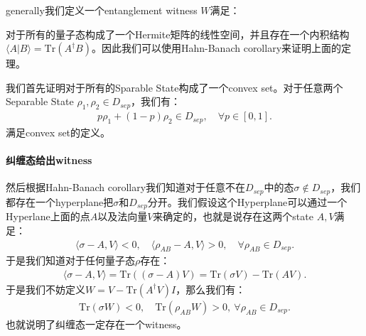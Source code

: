 generally我们定义一个entanglement witness $ W $满足：

\bigskip
{}

对于所有的量子态构成了一个Hermite矩阵的线性空间，并且存在一个内积结构$ \langle A | B \rangle =
\mathrm{Tr}(A^\dagger B) $。因此我们可以使用Hahn-Banach corollary来证明上面的定理。

我们首先证明对于所有的Sparable State构成了一个convex set。对于任意两个Separable State $
\rho_1, \rho_2 \in D_{sep} $，我们有：
\begin{align}
  p \rho_1 + (1-p) \rho_2  \in D_{sep}, \quad \forall p \in [0,1].
\end{align}
满足convex set的定义。

\paragraph{纠缠态给出witness}
然后根据Hahn-Banach corollary我们知道对于任意不在$ D_{sep} $中的态$ \sigma \notin
D_{sep} $，我们都存在一个hyperplane把$ \sigma $和$ D_{sep}
$分开。我们假设这个Hyperplane可以通过一个Hyperlane上面的点$ A $以及法向量$ V
$来确定的，也就是说存在这两个state $ A,V $满足：
\begin{align}
  \langle\sigma-A,V\rangle<0,\quad\langle\rho_{AB}-A,V\rangle>0,\quad\forall\rho_{AB}\in
  D_{sep}.
\end{align}
于是我们知道对于任何量子态$ \rho $存在：
\begin{align}
  \langle \sigma-A ,V \rangle = \mathrm{Tr}((\sigma - A) V) =
  \mathrm{Tr}(\sigma V) - \mathrm{Tr}(A V).
\end{align}
于是我们不妨定义$ W = V - \mathrm{Tr}(A^\dagger V) I $，那么我们有：
\begin{align}
  \mathrm{Tr}(\sigma
  W)<0,\quad\mathrm{Tr}(\rho_{AB}W)>0,\mathrm{~}\forall\rho_{AB}\in D_{sep}.
\end{align}
也就说明了纠缠态一定存在一个witness。

